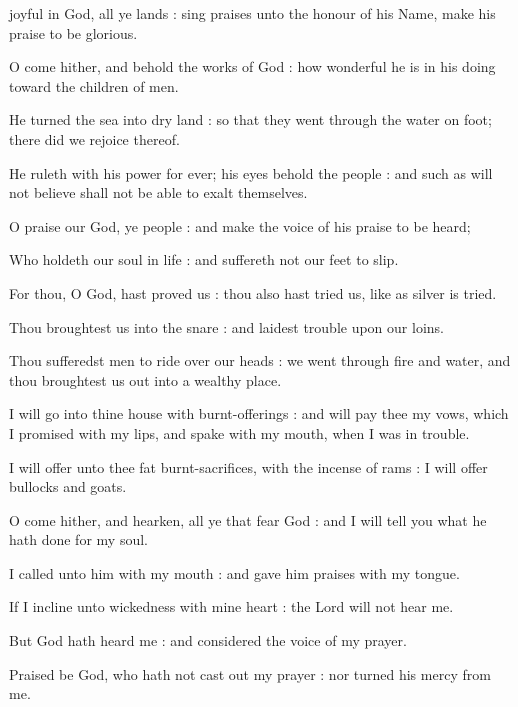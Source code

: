  joyful in God, all ye lands : sing praises unto the honour of his Name, make his praise to be glorious.\par
{}
O come hither, and behold the works of God : how wonderful he is in his doing toward the children of men.\par
{}He turned the sea into dry land : so that they went through the water on foot; there did we rejoice thereof.\par
{}He ruleth with his power for ever; his eyes behold the people : and such as will not believe shall not be able to exalt themselves.\par
{}O praise our God, ye people : and make the voice of his praise to be heard;\par
{}Who holdeth our soul in life : and suffereth not our feet to slip.\par
{}For thou, O God, hast proved us : thou also hast tried us, like as silver is tried.\par
{}Thou broughtest us into the snare : and laidest trouble upon our loins.\par
{}Thou sufferedst men to ride over our heads : we went through fire and water, and thou broughtest us out into a wealthy place.\par
{}I will go into thine house with burnt-offerings : and will pay thee my vows, which I promised with my lips, and spake with my mouth, when I was in trouble.\par
{}I will offer unto thee fat burnt-sacrifices, with the incense of rams : I will offer bullocks and goats.\par
{}O come hither, and hearken, all ye that fear God : and I will tell you what he hath done for my soul.\par
{}I called unto him with my mouth : and gave him praises with my tongue.\par
{}If I incline unto wickedness with mine heart : the Lord will not hear me.\par
{}But God hath heard me : and considered the voice of my prayer.\par
{}Praised be God, who hath not cast out my prayer : nor turned his mercy from me.\par

